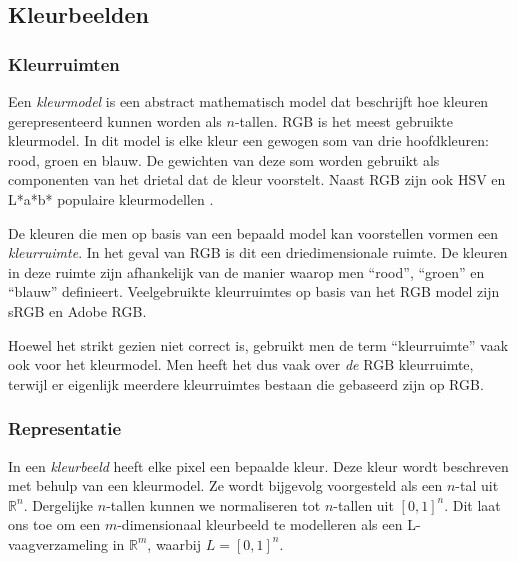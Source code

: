 \subsection{Kleurbeelden}

\subsubsection{Kleurruimten}

Een \emph{kleurmodel} is een abstract mathematisch model dat beschrijft hoe kleuren gerepresenteerd 
kunnen worden als $n$-tallen. RGB is het meest gebruikte kleurmodel. In dit model is elke kleur
een gewogen som van drie hoofdkleuren: rood, groen en blauw. De gewichten van deze som
worden gebruikt als componenten van het drietal dat de kleur voorstelt. Naast RGB zijn ook
HSV en L*a*b* populaire kleurmodellen \cite{phillips:beeldverwerking}.

De kleuren die men op basis van een bepaald model kan voorstellen vormen een \emph{kleurruimte}. 
In het geval van RGB is dit een driedimensionale ruimte. De kleuren in deze ruimte zijn afhankelijk
van de manier waarop men ``rood'', ``groen'' en ``blauw'' definieert. Veelgebruikte kleurruimtes 
op basis van het RGB model zijn sRGB en Adobe RGB.

Hoewel het strikt gezien niet correct is, gebruikt men de term ``kleurruimte'' vaak ook voor het
kleurmodel. Men heeft het dus vaak over \emph{de} RGB kleurruimte, terwijl er eigenlijk meerdere
kleurruimtes bestaan die gebaseerd zijn op RGB. 

\subsubsection{Representatie}

In een \emph{kleurbeeld} heeft elke pixel een bepaalde kleur. Deze kleur wordt beschreven met
behulp van een kleurmodel. Ze wordt bijgevolg voorgesteld als een $n$-tal uit
$\mathbb{R}^n$. Dergelijke $n$-tallen kunnen we normaliseren tot $n$-tallen uit $[0,1]^n$. 
Dit laat ons toe om een $m$-dimensionaal kleurbeeld te modelleren als een L-vaagverzameling in 
$\mathbb{R}^m$, waarbij $L=[0,1]^n$.

